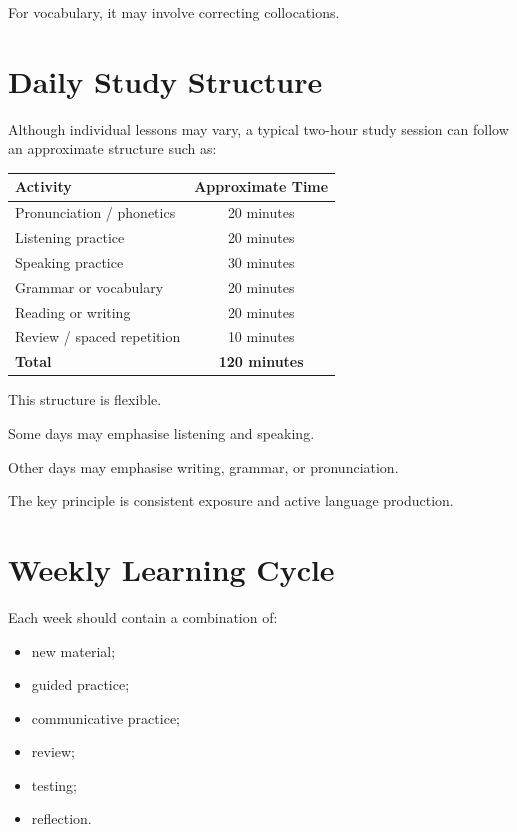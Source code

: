For vocabulary, it may involve correcting collocations.

\section*{Daily Study Structure}

Although individual lessons may vary, a typical two-hour study session can follow an approximate structure such as:

\begin{center}
\begin{tabular}{|l|c|}
\hline
\textbf{Activity} & \textbf{Approximate Time} \\
\hline
Pronunciation / phonetics & 20 minutes \\
Listening practice & 20 minutes \\
Speaking practice & 30 minutes \\
Grammar or vocabulary & 20 minutes \\
Reading or writing & 20 minutes \\
Review / spaced repetition & 10 minutes \\
\hline
\textbf{Total} & \textbf{120 minutes} \\
\hline
\end{tabular}
\end{center}

This structure is flexible.

Some days may emphasise listening and speaking.

Other days may emphasise writing, grammar, or pronunciation.

The key principle is consistent exposure and active language production.

\section*{Weekly Learning Cycle}

Each week should contain a combination of:

\begin{itemize}
    \item new material;
    \item guided practice;
    \item communicative practice;
    \item review;
    \item testing;
    \item reflection.
\end{itemize}

